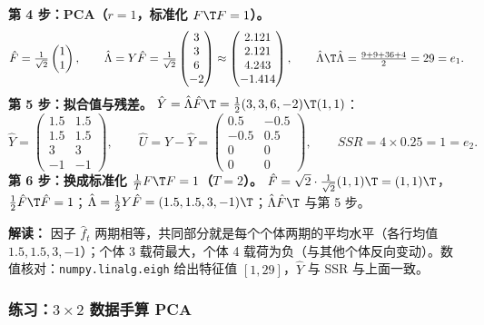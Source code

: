 \begin{exmp}[手算 PCA：$N=4$，$T=2$，$r=1$]
\textbf{第 4 步：PCA（$r=1$，标准化 $F\T F=1$）。}
\[
\hat F=\tfrac1{\sqrt2}\begin{pmatrix}1\\1\end{pmatrix},\qquad
\hat\Lambda=Y\hat F=\tfrac1{\sqrt2}\begin{pmatrix}3\\3\\6\\-2\end{pmatrix}\approx\begin{pmatrix}2.121\\2.121\\4.243\\-1.414\end{pmatrix},\qquad
\hat\Lambda\T\hat\Lambda=\tfrac{9+9+36+4}{2}=29=e_1 .
\]
\textbf{第 5 步：拟合值与残差。} $\hat Y=\hat\Lambda\hat F\T=\frac12(3,3,6,-2)\T(1,1)$：
\[
\hat Y=\begin{pmatrix}1.5&1.5\\1.5&1.5\\3&3\\-1&-1\end{pmatrix},\qquad
\hat U=Y-\hat Y=\begin{pmatrix}0.5&-0.5\\-0.5&0.5\\0&0\\0&0\end{pmatrix},\qquad
SSR=4\times0.25=1=e_2 .
\]
\textbf{第 6 步：换成标准化 $\frac1TF\T F=1$（$T=2$）。} $\hat F=\sqrt2\cdot\frac1{\sqrt2}(1,1)\T=(1,1)\T$，$\frac12\hat F\T\hat F=1$；$\hat\Lambda=\frac12Y\hat F=(1.5,1.5,3,-1)\T$；$\hat\Lambda\hat F\T$ 与第 5 步。

\textbf{解读：} 因子 $\hat f_t$ 两期相等，共同部分就是每个个体两期的平均水平（各行均值 $1.5,1.5,3,-1$）；个体 3 载荷最大，个体 4 载荷为负（与其他个体反向变动）。数值核对：\texttt{numpy.linalg.eigh} 给出特征值 $[1,29]$，$\hat Y$ 与 SSR 与上面一致。
\end{exmp}

\subsubsection{练习：\texorpdfstring{$3\times2$}{3 x 2} 数据手算 PCA}

